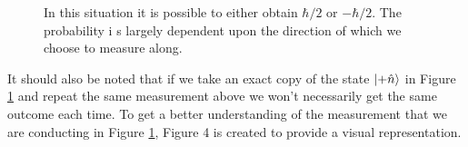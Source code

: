\documentclass[twocolumn]{article}
\begin{document}
\begin{figure}[ht]
    \centering
    \newcommand{\figthreecircrad}{0.25}
    \newcommand{\figthreelineaxstart}{2*\figthreecircrad}
    \newcommand{\figthreelineaxend}{\figthreelineaxstart + 1.25}
    \newcommand{\figthreerectheight}{3*\figthreecircrad}
    \newcommand{\figthreerectwidth}{2.5}
    \newcommand{\figthreerectx}{\figthreelineaxend}
    \newcommand{\figthreerecty}{-0.5*\figthreerectheight}
    \newcommand{\figthreelinebstartx}{\figthreerectx + \figthreerectwidth}
    \newcommand{\figthreelinebendx}{\figthreerectx + \figthreerectwidth + 1.25}
    \newcommand{\figthreelinecstartx}{\figthreerectx + \figthreerectwidth}
    \newcommand{\figthreelinecendx}{\figthreerectx + \figthreerectwidth + 1.25}
    \caption{\footnotesize{In this situation it is possible to either obtain $\hbar/2$ or $-\hbar/2$. The probability i   s largely dependent upon the direction of which we choose to measure along.}}
    \label{Fig: SWMD}
\end{figure}
\par \noindent
It should also be noted that if we take an exact copy of the state $\ket{+\hat{n}}$ in Figure \ref{Fig: SWMD} and repeat the same measurement above we won't necessarily get the same outcome each time. To get a better understanding of the measurement that we are conducting in Figure \ref{Fig: SWMD}, Figure 4 is created to provide a visual representation.
\end{document}
